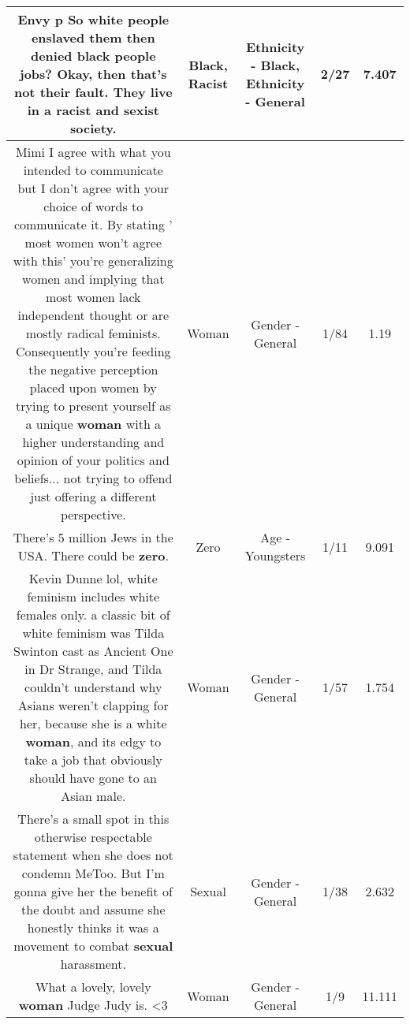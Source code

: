 \documentclass[11pt]{article}
\newlength\mylength
\begin{document}
\begin{center}
\begin{longtable}{|C{.65\mylength}|C{.30\mylength}|C{.12\mylength}|C{.12\mylength}|C{.12\mylength}|}
  \small {} Envy p So white people enslaved them then denied \textbf{black} people jobs? Okay, then that's not their fault. They live in a \textbf{racist} and sexist society.\normalsize   & Black, Racist & Ethnicity - Black, Ethnicity - General & 2/27 & 7.407 \\  \hline
  \small Mimi I agree with what you intended to communicate but I don't agree with your choice of words to communicate it. By stating ' most women won't agree with this' you're generalizing women and implying that most women lack independent thought or are mostly radical feminists. Consequently you're feeding the negative perception placed upon women by trying to present yourself as a unique \textbf{woman} with a higher understanding and opinion of your politics and beliefs... not trying to offend just offering a different perspective.\normalsize   & Woman & Gender - General & 1/84 & 1.19 \\  \hline
  \small There's 5 million Jews in the USA. There could be \textbf{zero}.\normalsize   & Zero & Age - Youngsters & 1/11 & 9.091 \\  \hline
  \small Kevin Dunne lol, white feminism includes white females only.  a classic bit of white feminism was Tilda Swinton cast as Ancient One in Dr Strange, and Tilda couldn't understand why Asians weren't clapping for her, because she is a white \textbf{woman}, and its edgy to take a job that obviously should have gone to an Asian male.\normalsize   & Woman & Gender - General & 1/57 & 1.754 \\  \hline
  \small There's a small spot in this otherwise respectable statement when she does not condemn MeToo. But I'm gonna give her the benefit of the doubt and assume she honestly thinks it was a movement to combat \textbf{sexual} harassment.\normalsize   & Sexual & Gender - General & 1/38 & 2.632 \\  \hline
  \small What a lovely, lovely \textbf{woman} Judge Judy is. <3\normalsize   & Woman & Gender - General & 1/9 & 11.111 \\  \hline

\end{longtable}
\end{center}
\end{document}
